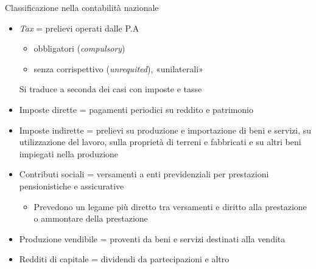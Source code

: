 \documentclass[aspectratio=64,12pt]{beamer}
\begin{document}
\begin{frame}{Classificazione nella contabilità nazionale}
\begin{itemize}
\item \emph{Tax} = prelievi operati dalle P.A
\begin{itemize}
\item obbligatori (\emph{compulsory})
\item senza corrispettivo (\emph{unrequited}), «unilaterali»
\end{itemize}
Si traduce a seconda dei casi con \alert{imposte} e \alert{tasse}
\item \alert{Imposte dirette} = pagamenti periodici su reddito e patrimonio
\item \alert{Imposte indirette} = prelievi su produzione e importazione di beni e
servizi, su utilizzazione del lavoro, sulla proprietà di terreni e
fabbricati e su altri beni impiegati nella produzione
\item \alert{Contributi sociali} = versamenti a enti previdenziali per prestazioni
pensionistiche e assicurative
\begin{itemize}
\item Prevedono un legame più diretto tra versamenti e diritto alla prestazione
o ammontare della prestazione
\end{itemize}
\item \alert{Produzione vendibile} = proventi da beni e servizi destinati alla vendita
\item \alert{Redditi di capitale} = dividendi da partecipazioni e altro
\end{itemize}
\end{frame}
\end{document}
